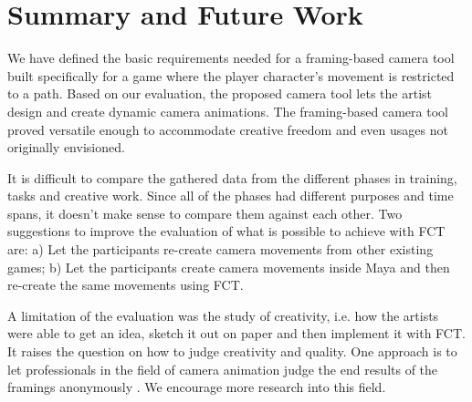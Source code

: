 \section{Summary and Future Work}
We have defined the basic requirements needed for a framing-based camera tool built specifically for a game where the player character's movement is restricted to a path. Based on our evaluation, the proposed camera tool lets the artist design and create dynamic camera animations. The framing-based camera tool proved versatile enough to accommodate creative freedom and even usages not originally envisioned. 

It is difficult to compare the gathered data from the different phases in training, tasks and creative work. Since all of the phases had different purposes and time spans, it doesn't make sense to compare them against each other. Two suggestions to improve the evaluation of what is possible to achieve with FCT are: a) Let the participants re-create camera movements from other existing games; b) Let the participants create camera movements inside Maya and then re-create the same movements using FCT.

A limitation of the evaluation was the study of creativity, i.e. how the artists were able to get an idea, sketch it out on paper and then implement it with FCT. It raises the question on how to judge creativity and quality. One approach is to let professionals in the field of camera animation judge the end results of the framings anonymously \cite{sadeghi_artist_2010}. We encourage more research into this field.